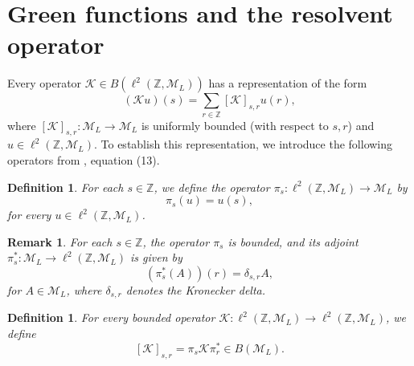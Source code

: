 \documentclass[12pt,oneside,onecolumn,open]{article}
\newtheorem{defi}[teo]{Definition}
\newtheorem{obs}[teo]{Remark}
\begin{document}
\section{Green functions and the resolvent operator}\label{GF}





Every  operator $\mathcal{K}\in B(\ell^{2}(\mathbb{Z},\mathcal{M}_{L}) )$ has a representation of the form
\begin{equation}
(\mathcal{K}u)(s) = \sum_{r\in \mathbb{Z}} [\mathcal{K}]_{s,r}u(r),
\end{equation}
where $[\mathcal{K}]_{s,r} : \mathcal{M}_{L} \to \mathcal{M}_{L}$ is uniformly bounded (with respect to $s, r$) and $u \in \ell^{2}(\mathbb{Z},\mathcal{M}_{L})$. To establish this representation, we introduce the following operators from \cite{MR4192212}, equation (13).

\begin{defi}
For each $s \in \mathbb{Z}$, we define the operator $\pi_{s}: \ell^{2}(\mathbb{Z},\mathcal{M}_{L}) \longrightarrow \mathcal{M}_{L}$ by
\begin{equation}
\pi_{s}(u) = u(s),
\end{equation}
for every $u \in \ell^{2}(\mathbb{Z},\mathcal{M}_{L})$.
\end{defi}

\begin{obs}
For each $s \in \mathbb{Z}$, the operator $\pi_{s}$ is bounded, and its adjoint $\pi_{s}^{*}: \mathcal{M}_{L} \longrightarrow \ell^{2}(\mathbb{Z},\mathcal{M}_{L})$ is given by
\begin{equation}
(\pi_{s}^{*}(A))(r) = \delta_{s,r}A,
\end{equation}
for $A \in \mathcal{M}_{L}$, where $\delta_{s,r}$ denotes the Kronecker delta.
\end{obs}

\begin{defi}\label{DKsr}
For every bounded operator $\mathcal{K}: \ell^{2}(\mathbb{Z},\mathcal{M}_{L}) \longrightarrow \ell^{2}(\mathbb{Z},\mathcal{M}_{L})$, we define
\[
[\mathcal{K}]_{s,r} = \pi_{s}\mathcal{K}\pi_{r}^{*} \in B(\mathcal{M}_L).
\]
\end{defi}
\end{document}

